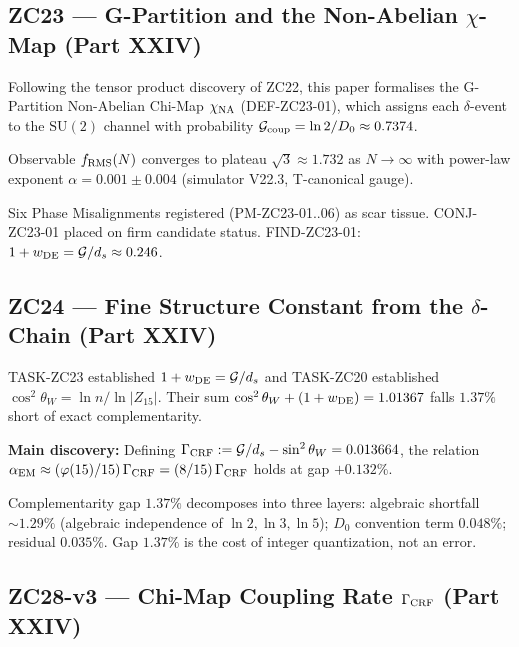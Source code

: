 \documentclass[11pt, a4paper]{article}
\newcommand{\chiNA}{\chi_{\rm NA}}
\newcommand{\Gcoup}{\mathcal{G}_{\rm coup}}
\begin{document}
\subsection{ZC23 --- G-Partition and the Non-Abelian $\chi$-Map (Part XXIV)}

\begin{zcbox}[title={ZC23: DEF-ZC23-01 and CONJ-ZC23-01}]
\sloppy
Following the tensor product discovery of ZC22, this paper formalises
the G-Partition Non-Abelian Chi-Map $\chiNA$ (DEF-ZC23-01), which assigns
each $\delta$-event to the $\mathrm{SU}(2)$ channel with probability
$\Gcoup = \ln 2/D_0 \approx 0.7374$.

Observable $f_{\rm RMS}(N)$ converges to plateau $\sqrt{3}\approx 1.732$
as $N\to\infty$ with power-law exponent $\alpha = 0.001\pm 0.004$
(simulator V22.3, T-canonical gauge).

Six Phase Misalignments registered (PM-ZC23-01..06) as scar tissue.
CONJ-ZC23-01 placed on firm candidate status.
FIND-ZC23-01: $1+w_{\rm DE} = \mathcal{G}/d_s \approx 0.246$.
\end{zcbox}

\subsection{ZC24 --- Fine Structure Constant from the $\delta$-Chain (Part XXIV)}

\begin{zcbox}[title={ZC24: $\alpha_{\rm EM}^{R_0} = (8/15)\Gamma_{\rm CRF}$}]
\sloppy
TASK-ZC23 established $1+w_{\rm DE} = \mathcal{G}/d_s$ and
TASK-ZC20 established $\cos^2\theta_W = \ln n/\ln|Z_{15}|$.
Their sum $\cos^2\theta_W + (1+w_{\rm DE}) = 1.01367$ falls $1.37\%$
short of exact complementarity.

\textbf{Main discovery:} Defining
$\Gamma_{\rm CRF} := \mathcal{G}/d_s - \sin^2\theta_W = 0.013664$,
the relation
$\alpha_{\rm EM} \approx (\varphi(15)/15)\,\Gamma_{\rm CRF} = (8/15)\,\Gamma_{\rm CRF}$
holds at gap $+0.132\%$.

Complementarity gap $1.37\%$ decomposes into three layers:
algebraic shortfall $\sim 1.29\%$ (algebraic independence of $\ln 2, \ln 3, \ln 5$);
$D_0$ convention term $0.048\%$; residual $0.035\%$.
Gap $1.37\%$ is the cost of integer quantization, not an error.
\end{zcbox}

\subsection{ZC28-v3 --- Chi-Map Coupling Rate $\Gamma_{\rm CRF}$ (Part XXIV)}
\end{document}
